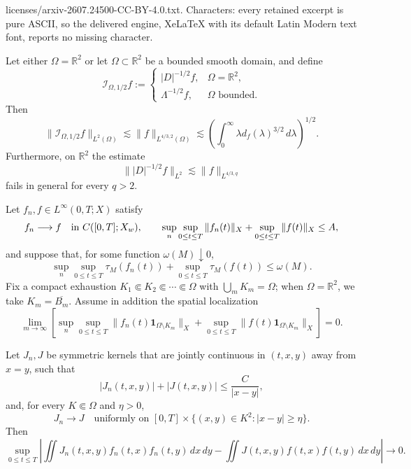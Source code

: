 \documentclass[10pt,a4paper]{amsart}
\newcommand{\Lam}{\Lambda}
\newcommand{\Om}{\Omega}
\newcommand{\R}{\mathbb R}
\newcommand{\dd}{\,d}
\newcommand{\one}{\mathbf 1}
\begin{document}
licenses/arxiv-2607.24500-CC-BY-4.0.txt. Characters: every retained excerpt is pure ASCII, so the delivered engine, XeLaTeX with its default Latin Modern text font, reports no missing character.
\begin{proposition}\label{prop:critical-lorentz}
Let either $\Om=\R^2$ or let $\Om\subset\R^2$ be a bounded smooth domain, and
define
\[
  \mathcal I_{\Om,1/2}f
  :=
  \begin{cases}
    |D|^{-1/2}f,&\Om=\R^2,\\
    \Lam^{-1/2}f,&\Om\text{ bounded}.
  \end{cases}
\]
Then
\begin{equation}\label{eq:critical-lorentz}
  \|\mathcal I_{\Om,1/2}f\|_{L^2(\Om)}
  \lesssim
  \|f\|_{L^{4/3,2}(\Om)}
  \lesssim
  \left(
  \int_0^\infty \lambda d_f(\lambda)^{3/2}\dd\lambda
  \right)^{1/2}.
\end{equation}
Furthermore, on $\R^2$ the estimate
\[
  \| |D|^{-1/2}f\|_{L^2}\lesssim \|f\|_{L^{4/3,q}}
\]
fails in general for every $q>2$.
\end{proposition}

\begin{lemma}
\label{lem:critical-quadratic-compactness}
Let $f_n,f\in L^\infty(0,T;X)$ satisfy
\[
  f_n\longrightarrow f\quad\text{in }C([0,T];X_{\rm w}),
  \qquad
  \sup_n\sup_{0\leq t\leq T}\|f_n(t)\|_X
  +\sup_{0\leq t\leq T}\|f(t)\|_X\leq A,
\]
and suppose that, for some function $\omega(M)\downarrow0$,
\[
  \sup_n\sup_{0\leq t\leq T}\tau_M(f_n(t))
  +\sup_{0\leq t\leq T}\tau_M(f(t))\leq\omega(M).
\]
Fix a compact exhaustion $K_1\Subset K_2\Subset\cdots\Subset\Om$ with
$\bigcup_mK_m=\Om$; when $\Om=\R^2$, we take $K_m=\overline{B_m}$.
Assume in addition the spatial localization
\begin{equation}\label{eq:abstract-spatial-localization}
 \lim_{m\to\infty}
 \left[
  \sup_n\sup_{0\leq t\leq T}\|f_n(t)\one_{\Om\setminus K_m}\|_X
  +\sup_{0\leq t\leq T}\|f(t)\one_{\Om\setminus K_m}\|_X
 \right]=0.
\end{equation}

Let $J_n,J$ be symmetric kernels that are jointly continuous in
$(t,x,y)$ away from $x=y$,
such that
\begin{equation}\label{eq:abstract-critical-kernel-bound}
  |J_n(t,x,y)|+|J(t,x,y)|\leq\frac{C}{|x-y|},
\end{equation}
and, for every $K\Subset\Om$ and $\eta>0$,
\[
  J_n\longrightarrow J
  \quad\text{uniformly on }
  [0,T]\times\{(x,y)\in K^2:|x-y|\geq\eta\}.
\]
Then
\begin{equation}\label{eq:abstract-quadratic-convergence}
 \sup_{0\leq t\leq T}
 \left|
  \iint J_n(t,x,y)f_n(t,x)f_n(t,y)\dd x\dd y
  -\iint J(t,x,y)f(t,x)f(t,y)\dd x\dd y
 \right|\longrightarrow0.
\end{equation}
\end{lemma}
\end{document}
